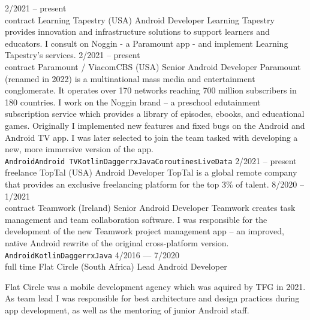 \documentclass[9pt]{developercv} %
\begin{document}
\begin{entrylist}
	\entry
		{2/2021 -- present\\\footnotesize{contract}}
		{Learning Tapestry {\normalfont\small (USA)}}
		{Android Developer}
		{Learning Tapestry provides innovation and infrastructure solutions to support learners and educators. I consult on Noggin - a Paramount app - and implement Learning Tapestry's services.}
	\entry
		{2/2021 -- present\\\footnotesize{contract}}
		{Paramount / ViacomCBS {\normalfont\small (USA)}}
		{Senior Android Developer}
		{Paramount (renamed in 2022) is a multinational mass media and entertainment conglomerate. It operates over 170 networks reaching 700 million subscribers in 180 countries. I work on the Noggin brand -- a preschool edutainment subscription service which provides a library of episodes, ebooks, and educational games. Originally I implemented new features and fixed bugs on the Android and Android TV app. I was later selected to join the team tasked with developing a new, more immersive version of the app.\\ \texttt{Android}\slashsep\texttt{Android TV}\slashsep\texttt{Kotlin}\slashsep\texttt{Dagger}\slashsep\texttt{rxJava}\slashsep\texttt{Coroutines}\slashsep\texttt{LiveData}}
	\entry
		{2/2021 -- present\\\footnotesize{freelance}}
		{TopTal {\normalfont\small (USA)}}
		{Android Developer}
		{TopTal is a global remote company that provides an exclusive freelancing platform for the top 3\% of talent.}
	\entry
		{8/2020 -- 1/2021\\\footnotesize{contract}}
		{Teamwork {\normalfont\small (Ireland)}}
		{Senior Android Developer}
		{Teamwork creates task management and team collaboration software. I was responsible for the development of the new Teamwork project management app -- an improved, native Android rewrite of the original cross-platform version.\\ \texttt{Android}\slashsep\texttt{Kotlin}\slashsep\texttt{Dagger}\slashsep\texttt{rxJava}}
	\entry
		{4/2016 --- 7/2020\\\footnotesize{full time}}
		{Flat Circle {\normalfont\small (South Africa)}}
		{Lead Android Developer}
		{Flat Circle was a mobile development agency which was aquired by TFG in 2021. As team lead I was responsible for best architecture and design practices during app development, as well as the mentoring of junior Android staff.\vspace{5pt}
		
}
\end{entrylist}
\end{document}
